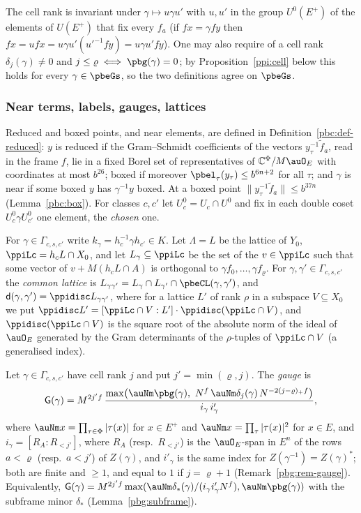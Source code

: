 \documentclass[10pt]{amsart}
\theoremstyle{definition}
\theoremstyle{remark}
\newcommand{\C}{\mathbb C}
\providecommand{\auPl}{\Phi}
\begin{document}
The cell rank is invariant under $\gamma\mapsto u\gamma u'$ with $u,u'$ in the group $U^0(E^+)$ of
the elements of $U(E^+)$ that fix every $f_a$ (if $fx=\gamma fy$ then $fx=ufx=u\gamma u'(u'^{-1}fy)=
u\gamma u'fy$). One may also require of a cell rank $\delta_{j}(\gamma)\ne0$
and $j\le\varrho\iff\pbg(\gamma)=0$; by Proposition~\ref{ppi:cell} below this holds for every
$\gamma\in\pbeGs$, so the two definitions agree on $\pbeGs$.

\subsubsection*{Near terms, labels, gauges, lattices}
Reduced and boxed points, and near elements, are defined in Definition~\ref{pbc:def-reduced}: $y$ is
reduced if the Gram--Schmidt coefficients of the vectors $y_\tau^{-1}\tilde f_a$, read in the frame
$f$, lie in a fixed Borel set of representatives of $\C^{\auPl}/M\auO_E$ with coordinates at most
$b^{26}$; boxed if moreover $\pbel_\tau(y_\tau)\le b^{6n+2}$ for all $\tau$; and $\gamma$ is near if
some boxed $y$ has $\gamma^{-1}y$ boxed. At a boxed point $\|y_\tau^{-1}\tilde f_a\|\le b^{37n}$
(Lemma~\ref{pbc:box}). For classes $c,c'$ let
$U_c^0=U_c\cap U^0$ and fix in each double coset $U_c^0\gamma U_{c'}^0$ one element, the \emph{chosen}
one.

For $\gamma\in\Gamma_{c,s,c'}$ write $k_\gamma=h_c^{-1}\gamma h_{c'}\in K$. Let $\Lambda=L$ be the
lattice of $Y_0$, $\ppiLc=h_cL\cap X_0$, and let $L_\gamma\subseteq\ppiLc$ be the set of the $v\in
\ppiLc$ such that some vector of $v+M(h_cL\cap A)$ is orthogonal to $\gamma f_0,\dots,\gamma
f_\varrho$. For $\gamma,\gamma'\in\Gamma_{c,s,c'}$ the \emph{common lattice} is $L_{\gamma\gamma'}=
L_\gamma\cap L_{\gamma'}\cap\pbeCL(\gamma,\gamma')$, and $\mathsf d(\gamma,\gamma')=\ppidisc
L_{\gamma\gamma'}$, where for a lattice $L'$ of rank $\rho$ in a subspace $V\subseteq X_0$ we put
$\ppidisc L'=[\ppiLc\cap V:L']\cdot\ppidisc(\ppiLc\cap V)$, and $\ppidisc(\ppiLc\cap V)$ is the square
root of the absolute norm of the ideal of $\auO_E$ generated by the Gram determinants of the $\rho$-tuples
of $\ppiLc\cap V$ (a generalised index).

Let $\gamma\in\Gamma_{c,s,c'}$ have cell rank $j$ and put $j'=\min(\varrho,j)$. The \emph{gauge} is
\begin{equation}\label{ppi:eq-gauge}
\mathsf G(\gamma)=M^{2j'f}\,\frac{\max\bigl(\auNm\pbg(\gamma),\ N^{f}\,\auNm\delta_j(\gamma)\,N^{-2(j-
\varrho)_+f}\bigr)}{i_\gamma\,i'_\gamma},
\end{equation}
where $\auNm x=\prod_{\tau\in\auPl}|\tau(x)|$ for $x\in E^+$ and $\auNm x=\prod_\tau|\tau(x)|^2$ for
$x\in E$, and $i_\gamma=[R_A:R_{<j'}]$, where $R_A$ (resp.\ $R_{<j'}$) is the $\auO_E$-span in $E^n$ of the
rows $a<\varrho$ (resp.\ $a<j'$) of $Z(\gamma)$, and $i'_\gamma$ is the same index for
$Z(\gamma^{-1})=Z(\gamma)^*$; both are finite and $\ge1$, and equal to $1$ if $j=\varrho+1$
(Remark~\ref{pbg:rem-gauge}). Equivalently, $\mathsf G(\gamma)=M^{2j'f}\max(\auNm\delta_*(\gamma)/
(i_\gamma i'_\gamma N^f),\auNm\pbg(\gamma))$ with the subframe minor $\delta_*$
(Lemma~\ref{pbg:subframe}).
\end{document}
